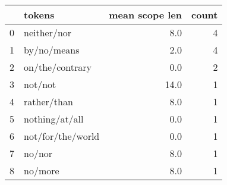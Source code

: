 \begin{tabular}{llrr}
\toprule
{} &             tokens &  mean scope len &  count \\
\midrule
0 &        neither/nor &             8.0 &      4 \\
1 &        by/no/means &             2.0 &      4 \\
2 &    on/the/contrary &             0.0 &      2 \\
3 &            not/not &            14.0 &      1 \\
4 &        rather/than &             8.0 &      1 \\
5 &     nothing/at/all &             0.0 &      1 \\
6 &  not/for/the/world &             0.0 &      1 \\
7 &             no/nor &             8.0 &      1 \\
8 &            no/more &             8.0 &      1 \\
\bottomrule
\end{tabular}
